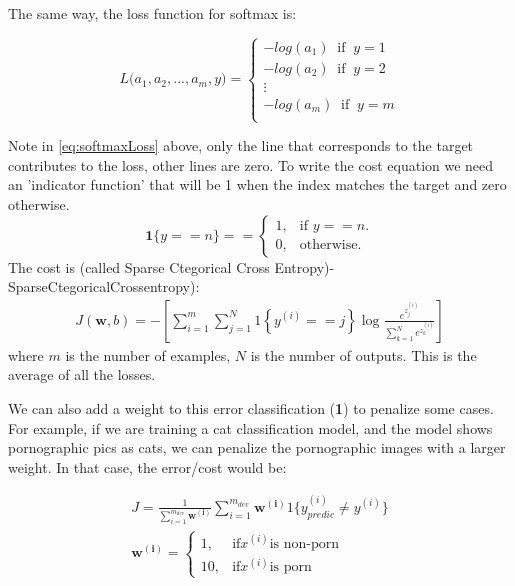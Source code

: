\documentclass[12pt]{report}
\begin{document}
The same way, the loss function for softmax is:

\begin{equation}
  L\big( a_1, a_2, ..., a_m, y \big) =
  \begin{cases}
    -log ( a_1 )  \;\; \text{if} \;\; y = 1  \\
    -log ( a_2 )  \;\; \text{if} \;\; y = 2  \\
    \vdots\\
    -log ( a_m )  \;\; \text{if} \;\; y = m  \\
  \end{cases}
  \label{eq:softmaxLoss}
\end{equation}

Note in \ref{eq:softmaxLoss} above, only the line that corresponds to the target contributes to the loss, other lines are zero. To write the cost equation we need an 'indicator function' that will be 1 when the index matches the target and zero otherwise.
$$\mathbf{1}\{y == n\} = =\begin{cases}
  1, & \text{if $y==n$}.\\
  0, & \text{otherwise}.
\end{cases}$$
The cost is (called Sparse Ctegorical Cross Entropy)-SparseCtegoricalCrossentropy):
\begin{align}
  J(\mathbf{w},b) = - \left[ \sum_{i=1}^{m} \sum_{j=1}^{N}  1\left\{y^{(i)} == j\right\} \log \frac{e^{z^{(i)}_j}}{\sum_{k=1}^N e^{z^{(i)}_k} }\right] \tag{4}
\end{align}
where $m$ is the number of examples, $N$ is the number of outputs. This is the average of all the losses.





We can also add a weight to this error classification (\textbf{1}) to penalize some cases. For example, if we are training a cat classification model, and the model shows pornographic pics as cats, we can penalize the pornographic images with a larger weight. In that case, the error/cost would be:


\begin{align}
  J = \frac{1}{ \sum_{i = 1}^{m_{dev}} \mathbf{w^{(i)}} } \sum_{i = 1}^{m_{dev}} \mathbf{w^{(i)}} 1 \{y_{predic}^{(i)}  \neq y^{(i)} \}\\
  \mathbf{w^{(i)}} = \begin{cases}
    1, & \text{if} x^{(i)} \text{is non-porn} \\
    10, & \text{if} x^{(i)} \text{is porn}
  \end{cases}
\end{align}
\end{document}
